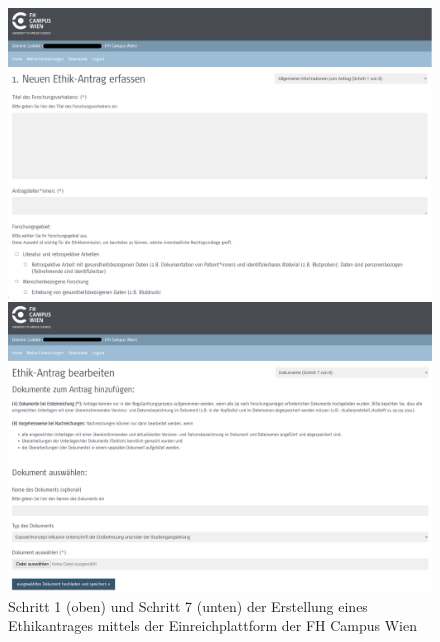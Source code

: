 \documentclass[a4paper,12pt,twoside]{scrreprt}
\begin{document}
\begin{figure}[htp]
    \centering
    \begin{minipage}[t]{.97\linewidth}
        \includegraphics[width=\linewidth]{thesis/images/Luidold_Einreichplattform-Formular-Schritt-1.png}
    \end{minipage}
    \begin{minipage}[b]{.97\linewidth}
        \includegraphics[width=\linewidth]{thesis/images/Luidold_Einreichplattform-Formular-Schritt-2.png}
    \end{minipage}
    \caption[Schritt 1 und Schritt 7 der Erstellung eines Ethikantrages mittels der Einreichplattform der FH Campus Wien]{Schritt 1 (oben) und Schritt 7 (unten) der Erstellung eines Ethikantrages mittels der Einreichplattform der FH Campus Wien \cite{ethikkommission_fh_campus_wien_fh_2023}}
    \label{fig:einreichplattform-fhcw-schritt-1-7}
\end{figure}
\end{document}
